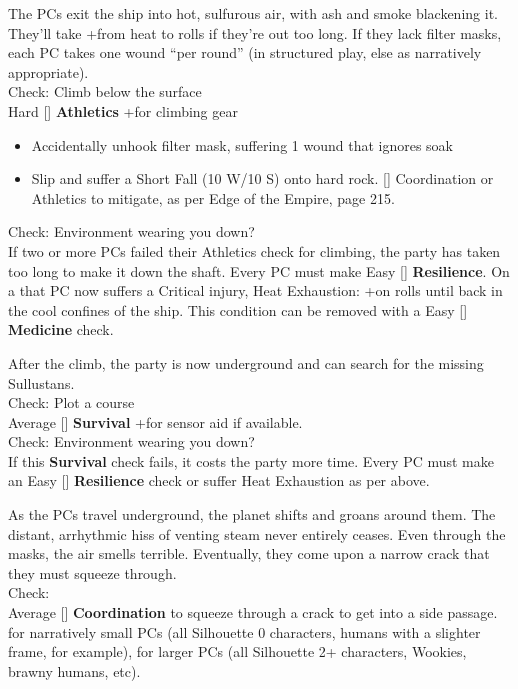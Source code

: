 \documentclass{book}
\newcommand{\df}{\difficulty}
\begin{document}
\begin{multicols*}{2}
The PCs exit the ship into hot, sulfurous air, with ash and smoke blackening it. They’ll take +\setback from heat to rolls if they’re out too long. If they lack filter masks, each PC takes one wound ``per round'' (in structured play, else as narratively appropriate).\\
Check: Climb below the surface\\
Hard [\df\df\df] \textbf{Athletics} +\boost for climbing gear
\begin{itemize}
  \item \threat\threat Accidentally unhook filter mask, suffering 1 wound that ignores soak
  \item \despair Slip and suffer a Short Fall (10 W/10 S) onto hard rock.  [\df\df] Coordination or Athletics to mitigate, as per Edge of the Empire, page 215.
\end{itemize}
Check: Environment wearing you down?\\
If two or more PCs failed their Athletics check for climbing, the party has taken too long to make it down the shaft. Every PC must make Easy [\df] \textbf{Resilience}. On a \failure that PC now suffers a Critical injury, Heat Exhaustion: +\setback on rolls until back in the cool confines of the ship. This condition can be removed with a Easy [\df] \textbf{Medicine} check.

After the climb, the party is now underground and can search for the missing Sullustans.\\
Check: Plot a course\\
Average [\df\df] \textbf{Survival} +\boost for sensor aid if available.\\
Check: Environment wearing you down?\\
If this \textbf{Survival} check fails, it costs the party more time. Every PC must make an Easy [\df] \textbf{Resilience} check or suffer Heat Exhaustion as per above.

As the PCs travel underground, the planet shifts and groans around them. The distant, arrhythmic hiss of venting steam never entirely ceases. Even through the masks, the air smells terrible. Eventually, they come upon a narrow crack that they must squeeze through.\\
Check:\\
Average [\df\df] \textbf{Coordination} to squeeze through a crack to get into a side passage. \boost for narratively small PCs (all Silhouette 0 characters, humans with a slighter frame, for example), \setback for larger PCs (all Silhouette 2+ characters, Wookies, brawny humans, etc).


\end{multicols*}
\end{document}
